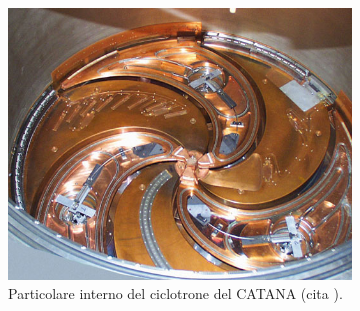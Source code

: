 \documentclass[12pt,a4paper,twoside]{report}
\begin{document}
	\begin{figure}[H]
		\centering
		\begin{subfigure}[b]{0.49\textwidth}
			\centering
			\includegraphics[width=\textwidth, scale=0.5]{catana1.jpg}
			\caption{Particolare interno del ciclotrone del CATANA (cita
				).}
			\label{fig:catana1}
		\end{subfigure}
		\hfill
		\begin{subfigure}[b]{0.49\textwidth}
			\centering

\end{subfigure}
\end{figure}
\end{document}

